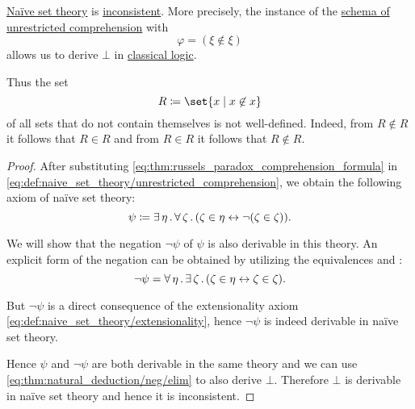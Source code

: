 \begin{theorem}\label{thm:russels_paradox}
  \hyperref[def:naive_set_theory]{Na\"ive set theory} is \hyperref[def:first_order_theory/consistent]{inconsistent}. More precisely, the instance of the \hyperref[def:naive_set_theory/unrestricted_comprehension]{schema of unrestricted comprehension} with
  \begin{equation}\label{eq:thm:russels_paradox_comprehension_formula}
    \varphi = (\xi \not\in \xi)
  \end{equation}
  allows us to derive \( \bot \) in \hyperref[def:classical_logic]{classical logic}.

  Thus the set
  \begin{equation}\label{eq:thm:russels_paradox_set}
    R \coloneqq \set{ x \given x \not\in x }
  \end{equation}
  of all sets that do not contain themselves is not well-defined. Indeed, from \( R \not\in R \) it follows that \( R \in R \) and from \( R \in R \) it follows that \( R \not\in R \).
\end{theorem}
\begin{proof}
  After substituting \eqref{eq:thm:russels_paradox_comprehension_formula} in \eqref{eq:def:naive_set_theory/unrestricted_comprehension}, we obtain the following axiom of na\"ive set theory:
  \begin{equation}\label{eq:thm:russels_paradox_comprehension_axiom}
    \psi \coloneqq \exists \thinspace \eta \thinspace . \thinspace \forall \thinspace \zeta \thinspace . \thinspace (\zeta \in \eta \leftrightarrow \neg (\zeta \in \zeta)).
  \end{equation}

  We will show that the negation \( \neg\psi \) of \( \psi \) is also derivable in this theory. An explicit form of the negation can be obtained by utilizing the equivalences  and :
  \begin{equation*}
    \neg\psi = \forall \thinspace \eta \thinspace . \thinspace \exists \thinspace \zeta \thinspace . \thinspace (\zeta \in \eta \leftrightarrow \zeta \in \zeta).
  \end{equation*}

  But \( \neg\psi \) is a direct consequence of the extensionality axiom \eqref{eq:def:naive_set_theory/extensionality}, hence \( \neg\psi \) is indeed derivable in na\"ive set theory.

  Hence \( \psi \) and \( \neg\psi \) are both derivable in the same theory and we can use \eqref{eq:thm:natural_deduction/neg/elim} to also derive \( \bot \). Therefore \( \bot \) is derivable in na\"ive set theory and hence it is inconsistent.
\end{proof}

